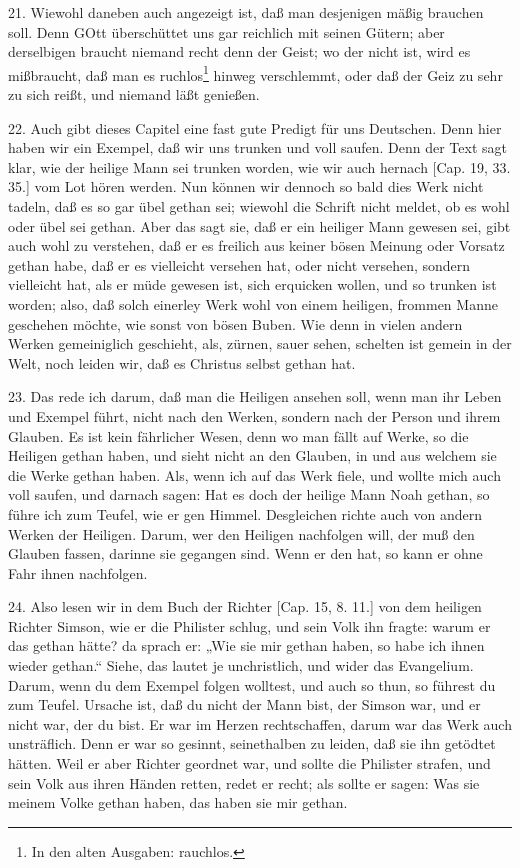 21. Wiewohl daneben auch angezeigt ist, daß man desjenigen mäßig brauchen soll. Denn GOtt überschüttet uns gar reichlich mit seinen Gütern; aber derselbigen braucht niemand recht denn der Geist; wo der nicht ist, wird es mißbraucht, daß man es ruchlos\footnote{In den alten Ausgaben: rauchlos.} hinweg verschlemmt, oder daß der Geiz zu sehr zu sich reißt, und niemand läßt genießen.

22. Auch gibt dieses Capitel eine fast gute Predigt für uns Deutschen. Denn hier haben wir ein Exempel, daß wir uns trunken und voll saufen. Denn der Text sagt klar, wie der heilige Mann sei trunken worden, wie wir auch hernach [Cap. 19, 33. 35.] vom Lot hören werden. Nun können wir dennoch so bald dies Werk nicht tadeln, daß es so gar übel gethan sei; wiewohl die Schrift nicht meldet, ob es wohl oder übel sei gethan. Aber das sagt sie, daß er ein heiliger Mann gewesen sei, gibt auch wohl zu verstehen, daß er es freilich aus keiner bösen Meinung oder Vorsatz gethan habe, daß er es vielleicht versehen hat, oder nicht versehen, sondern vielleicht hat, als er müde gewesen ist, sich erquicken wollen, und so trunken ist worden; also, daß solch einerley Werk wohl von einem heiligen, frommen Manne geschehen möchte, wie sonst von bösen Buben. Wie denn in vielen andern Werken gemeiniglich geschieht, als, zürnen, sauer sehen, schelten ist gemein in der Welt, noch leiden wir, daß es Christus selbst gethan hat.

23. Das rede ich darum, daß man die Heiligen ansehen soll, wenn man ihr Leben und Exempel führt, nicht nach den Werken, sondern nach der Person und ihrem Glauben. Es ist kein fährlicher Wesen, denn wo man fällt auf Werke, so die Heiligen gethan haben, und sieht nicht an den Glauben, in und aus welchem sie die Werke gethan haben. Als, wenn ich auf das Werk fiele, und wollte mich auch voll saufen, und darnach sagen: Hat es doch der heilige Mann Noah gethan, so führe ich zum Teufel, wie er gen Himmel. Desgleichen richte auch von andern Werken der Heiligen. Darum, wer den Heiligen nachfolgen will, der muß den Glauben fassen, darinne sie gegangen sind. Wenn er den hat, so kann er ohne Fahr ihnen nachfolgen.

24. Also lesen wir in dem Buch der Richter [Cap. 15, 8. 11.] von dem heiligen Richter Simson, wie er die Philister schlug, und sein Volk ihn fragte: warum er das gethan hätte? da sprach er: „Wie sie mir gethan haben, so habe ich ihnen wieder gethan.“ Siehe, das lautet je unchristlich, und wider das Evangelium. Darum, wenn du dem Exempel folgen wolltest, und auch so thun, so führest du zum Teufel. Ursache ist, daß du nicht der Mann bist, der Simson war, und er nicht war, der du bist. Er war im Herzen rechtschaffen, darum war das Werk auch unsträflich. Denn er war so gesinnt, seinethalben zu leiden, daß sie ihn getödtet hätten. Weil er aber Richter geordnet war, und sollte die Philister strafen, und sein Volk aus ihren Händen retten, redet er recht; als sollte er sagen: Was sie meinem Volke gethan haben, das haben sie mir gethan.


